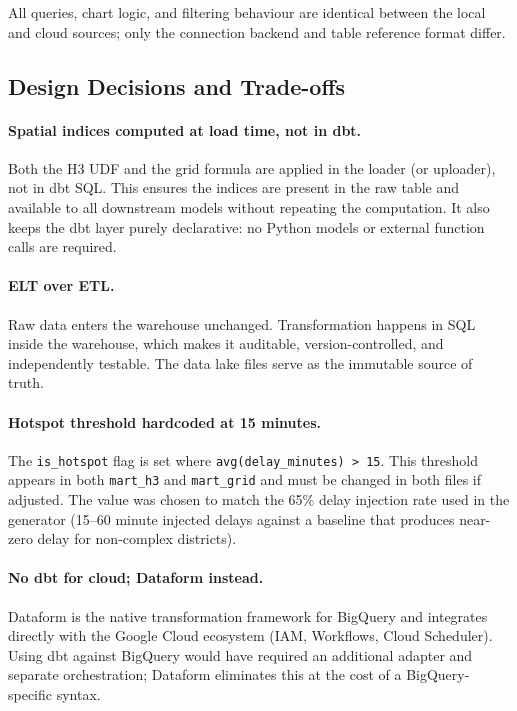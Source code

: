 All queries, chart logic, and filtering behaviour are identical between the local and
cloud sources; only the connection backend and table reference format differ.

\subsection{Design Decisions and Trade-offs}
\label{sec:design_decisions}

\paragraph{Spatial indices computed at load time, not in dbt.}
Both the H3 UDF and the grid formula are applied in the loader (or uploader), not in
dbt SQL. This ensures the indices are present in the raw table and available to all
downstream models without repeating the computation. It also keeps the dbt layer
purely declarative: no Python models or external function calls are required.

\paragraph{ELT over ETL.}
Raw data enters the warehouse unchanged. Transformation happens in SQL inside the
warehouse, which makes it auditable, version-controlled, and independently testable.
The data lake files serve as the immutable source of truth.

\paragraph{Hotspot threshold hardcoded at 15 minutes.}
The \texttt{is\_hotspot} flag is set where \texttt{avg(delay\_minutes) > 15}.
This threshold appears in both \texttt{mart\_h3} and \texttt{mart\_grid} and must be
changed in both files if adjusted. The value was chosen to match the 65\% delay
injection rate used in the generator (15--60 minute injected delays against a baseline
that produces near-zero delay for non-complex districts).

\paragraph{No dbt for cloud; Dataform instead.}
Dataform is the native transformation framework for BigQuery and integrates directly
with the Google Cloud ecosystem (IAM, Workflows, Cloud Scheduler). Using dbt against
BigQuery would have required an additional adapter and separate orchestration; Dataform
eliminates this at the cost of a BigQuery-specific syntax.
